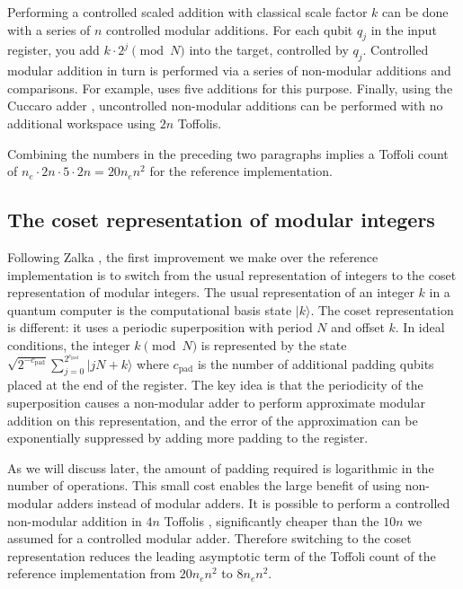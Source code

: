 \documentclass[superscriptaddress,notitlepage,longbibliography]{revtex4-1}
\theoremstyle{definition}
\theoremstyle{definition}
\newcommand{\lenexp}{{n_e}}
\newcommand{\gpad}{{c_{\text{pad}}}}
\begin{document}
Performing a controlled scaled addition with classical scale factor $k$ can be done with a series of $n$ controlled modular additions.
For each qubit $q_j$ in the input register, you add $k \cdot 2^j \pmod{N}$ into the target, controlled by $q_j$.
Controlled modular addition in turn is performed via a series of non-modular additions and comparisons.
For example, \cite{vedral1996arithmetic} uses five additions for this purpose.
Finally, using the Cuccaro adder \cite{cuccaro2004adder}, uncontrolled non-modular additions can be performed with no additional workspace using $2n$ Toffolis.

Combining the numbers in the preceding two paragraphs implies a Toffoli count of $\lenexp \cdot 2n \cdot 5 \cdot 2n = 20 \lenexp n^2$ for the reference implementation.


\subsection{The coset representation of modular integers}

Following Zalka \cite{zalka2006pure}, the first improvement we make over the reference implementation is to switch from the usual representation of integers to the coset representation of modular integers.
The usual representation of an integer $k$ in a quantum computer is the computational basis state $|k\rangle$.
The coset representation is different: it uses a periodic superposition with period $N$ and offset $k$.
In ideal conditions, the integer $k \pmod{N}$ is represented by the state $\sqrt{2^{-\gpad}} \sum_{j=0}^{2^\gpad} |jN + k\rangle$ where $\gpad$ is the number of additional padding qubits placed at the end of the register.
The key idea is that the periodicity of the superposition causes a non-modular adder to perform approximate modular addition on this representation, and the error of the approximation can be exponentially suppressed by adding more padding to the register.

As we will discuss later, the amount of padding required is logarithmic in the number of operations.
This small cost enables the large benefit of using non-modular adders instead of modular adders.
It is possible to perform a controlled non-modular addition in $4n$ Toffolis \cite{cuccaro2004adder, gidney2018addition}, significantly cheaper than the $10n$ we assumed for a controlled modular adder.
Therefore switching to the coset representation reduces the leading asymptotic term of the Toffoli count of the reference implementation from $20 \lenexp n^2$ to $8 \lenexp n^2$.
\end{document}
